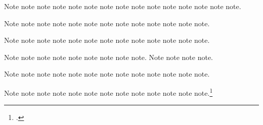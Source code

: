 \documentclass[a4paper,12pt]{report}
\begin{document}
Note\autocite{ac:comment} note\autocite{adorno:benj}
note\autocite{american:crime} note\autocite{amlen:hoot}
note\autocite{amlen:wordplay} note\autocite{aristotle:metaphy:gr}
note\autocite{adorno:benj} note\autocite[23]{adorno:benj}
note\autocite{ashbrook:brain} note\autocite{american:crime}
note\autocite{amlen:hoot} note\autocite{amlen:wordplay}
note\autocite[3.2.996b5--8]{aristotle:metaphy:gr}
note\autocite{ac:comment} note\autocite{assocpress:gun}.

Note\autocite{auden:reading} note\autocite[149]{ashbrook:brain}
note\autocite{author:forthcoming} note\autocite{assocpress:gun}
note\autocite{babb:peru} note\autocite{author:forthcoming}
note\autocite{auden:reading} note\autocite{barcott:review}
note\autocite{batson} note\autocite{babb:peru}
note\autocite{barcott:review} note\autocite[339]{batson}
note\autocite{beattie:crime}.

Note\autocite{bedford:photo} note\autocite{babb:peru}
note\autocite{beethoven:sonata29} note\autocite{bernhard:boris}
note\autocite{bernhard:ritter} note\autocite{bernstein:shostakovich}
note\autocite{black:infectious} note\autocite{boxer:china}
note\autocite{beattie:crime} note\autocite{braun:reply}
note\autocite{brown:bremer} note\autocite{beethoven:sonata29}
note\autocite{bernhard:ritter}.

Note\autocite{bernstein:shostakovich} note\autocite{bernhard:boris}
note\autocite{black:infectious} note\autocite{braun:reply}
note\autocite{boxer:china} note\autocite{browning:aurora}
note\autocite[pt.\ 2, 55]{brown:bremer} note\autocite{bundy:macneil}
note\autocite{centinel:letters}.  Note\autocite{chaucer:liferecords}
note\autocite{browning:aurora}
note\autocite[\printdate]{bundy:macneil}
note\autocite[29]{centinel:letters}.

Note\autocite{chaucer:alt} note\autocite{clark:mesopot}
note\autocite{chaucer:liferecords} note\autocite{cleese:holygrail}
note\autocite{Clemens:letter} note\autocite{cohen:schiff}
note\autocite{Clemens:letter} note\autocite{clark:mesopot}
note\autocite{cleese:holygrail} note\autocite{cohen:schiff}
note\autocite{chaucer:alt} note\autocite{conley:fifthgrade}
note\autocite{contrib:contrib}.

Note\autocite{conley:fifthgrade} note\autocite{contrib:contrib}
note\autocite{cook:sotweed} note\autocite{cotton:manufacture}
note\autocite{coolidge:speech} note\autocite{cook:sotweed}
note\autocite{creasey:ashe:blast} note\autocite{creasey:york:death}
note\autocite{cotton:manufacture} note\autocite{creasey:morton:hide}
note\autocite{coolidge:speech} note\autocite{creasey:ashe:blast}
note.\footnote{.}
\end{document}
